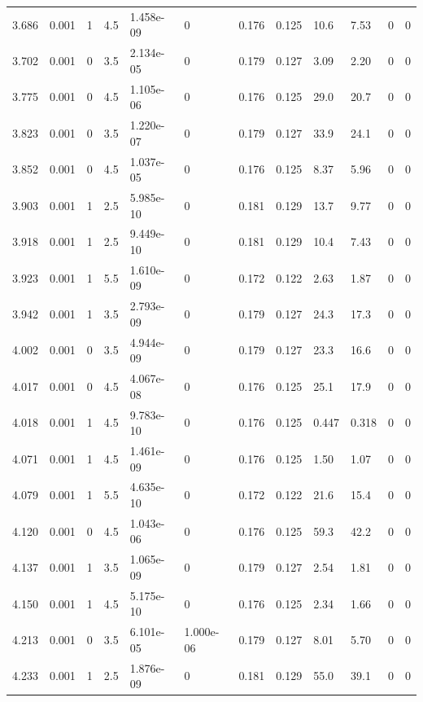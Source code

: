 \documentclass[preview]{standalone}
\begin{document}
{{{{\begin{tabular}{L{1.2cm}C{1.2cm} C{0.3cm}C{0.5cm} C{1.4cm}C{1.4cm} C{1.4cm}C{1.4cm} C{1.6cm}C{1.6cm} C{1.6cm}C{1.6cm}}
  3.686  &  0.001  & 1     & 4.5 &  1.458e-09  & 0  &  0.176&   0.125& 10.6 & 7.53   &  0 & 0  \\ 
  3.702  &  0.001  & 0     & 3.5 &  2.134e-05  & 0  &  0.179&   0.127& 3.09 & 2.20   &  0 & 0  \\ 
  3.775  &  0.001  & 0     & 4.5 &  1.105e-06  & 0  &  0.176&   0.125& 29.0 & 20.7   &  0 & 0  \\ 
  3.823  &  0.001  & 0     & 3.5 &  1.220e-07  & 0  &  0.179&   0.127& 33.9 & 24.1   &  0 & 0  \\ 
  3.852  &  0.001  & 0     & 4.5 &  1.037e-05  & 0  &  0.176&   0.125& 8.37 & 5.96   &  0 & 0  \\ 
  3.903  &  0.001  & 1     & 2.5 &  5.985e-10  & 0  &  0.181&   0.129& 13.7 & 9.77   &  0 & 0  \\ 
  3.918  &  0.001  & 1     & 2.5 &  9.449e-10  & 0  &  0.181&   0.129& 10.4 & 7.43   &  0 & 0  \\ 
  3.923  &  0.001  & 1     & 5.5 &  1.610e-09  & 0  &  0.172&   0.122& 2.63 & 1.87   &  0 & 0  \\ 
  3.942  &  0.001  & 1     & 3.5 &  2.793e-09  & 0  &  0.179&   0.127& 24.3 & 17.3   &  0 & 0  \\ 
  4.002  &  0.001  & 0     & 3.5 &  4.944e-09  & 0  &  0.179&   0.127& 23.3 & 16.6   &  0 & 0  \\ 
  4.017  &  0.001  & 0     & 4.5 &  4.067e-08  & 0  &  0.176&   0.125& 25.1 & 17.9   &  0 & 0  \\ 
  4.018  &  0.001  & 1     & 4.5 &  9.783e-10  & 0  &  0.176&   0.125& 0.447 & 0.318   &  0 & 0  \\ 
  4.071  &  0.001  & 1     & 4.5 &  1.461e-09  & 0  &  0.176&   0.125& 1.50 & 1.07   &  0 & 0  \\ 
  4.079  &  0.001  & 1     & 5.5 &  4.635e-10  & 0  &  0.172&   0.122& 21.6 & 15.4   &  0 & 0  \\ 
  4.120  &  0.001  & 0     & 4.5 &  1.043e-06  & 0  &  0.176&   0.125& 59.3 & 42.2   &  0 & 0  \\ 
  4.137  &  0.001  & 1     & 3.5 &  1.065e-09  & 0  &  0.179&   0.127& 2.54 & 1.81   &  0 & 0  \\ 
  4.150  &  0.001  & 1     & 4.5 &  5.175e-10  & 0  &  0.176&   0.125& 2.34 & 1.66   &  0 & 0  \\ 
  4.213  &  0.001  & 0     & 3.5 &  6.101e-05  & 1.000e-06  &  0.179&   0.127& 8.01 & 5.70   &  0 & 0  \\ 
  4.233  &  0.001  & 1     & 2.5 &  1.876e-09  & 0  &  0.181&   0.129& 55.0 & 39.1   &  0 & 0  \\ 

\end{tabular}}}}}
\end{document}
